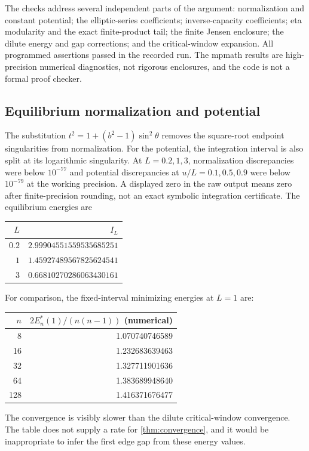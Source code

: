 \documentclass[11pt,a4paper]{article}
\theoremstyle{definition}
\theoremstyle{remark}
\begin{document}
The checks address several independent parts of the argument: normalization
and constant potential; the elliptic-series coefficients; inverse-capacity
coefficients; eta modularity and the exact finite-product tail; the finite
Jensen enclosure; the dilute energy and gap corrections; and the
critical-window expansion. All programmed assertions passed in the
recorded run. The mpmath results are high-precision numerical diagnostics,
not rigorous enclosures, and the code is not a formal proof checker.

\subsection{Equilibrium normalization and potential}
The substitution $t^2=1+(b^2-1)\sin^2\theta$ removes the square-root
endpoint singularities from normalization. For the potential, the
integration interval is also split at its logarithmic singularity.
At $L=0.2,1,3$, normalization discrepancies were below $10^{-77}$ and
potential discrepancies at $u/L=0.1,0.5,0.9$ were below $10^{-79}$ at the
working precision. A displayed zero in the raw output means zero after
finite-precision rounding, not an exact symbolic integration certificate.
The equilibrium energies are
\begin{center}
\begin{tabular}{@{}rr@{}}
\toprule
$L$ & $I_L$\\
\midrule
$0.2$ & $2.99904551559535685251$\\
$1$ & $1.45927489567825624541$\\
$3$ & $0.66810270286063430161$\\
\bottomrule
\end{tabular}
\end{center}

For comparison, the fixed-interval minimizing energies at $L=1$ are:
\begin{center}
\begin{tabular}{@{}rr@{}}
\toprule
$n$ & $2E_n^*(1)/(n(n-1))$ (numerical)\\
\midrule
8 & 1.070740746589\\
16 & 1.232683639463\\
32 & 1.327711901636\\
64 & 1.383689948640\\
128 & 1.416371676477\\
\bottomrule
\end{tabular}
\end{center}
The convergence is visibly slower than the dilute critical-window
convergence. The table does not supply a rate for
\cref{thm:convergence}, and it would be inappropriate to infer the first
edge gap from these energy values.
\end{document}
